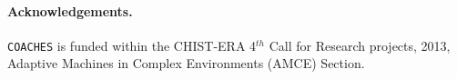 \documentclass{llncs}
\def\coaches{{\tt COACHES} }
\begin{document}










\paragraph{\bf  Acknowledgements.}

\coaches is funded within the CHIST-ERA 4$^{th}$ Call for Research projects, 2013,
Adaptive Machines in Complex Environments (AMCE) Section.




\end{document}
